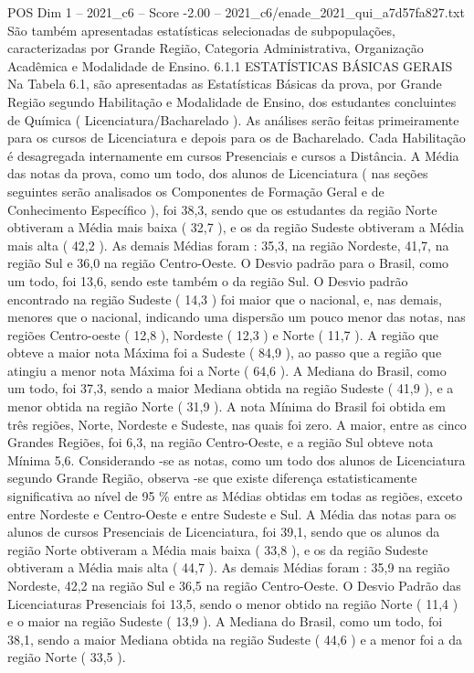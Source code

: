 \begin{textsample}{POS Dim 1 – 2021\_c6 – Score -2.00 – 2021\_c6/enade\_2021\_qui\_a7d57fa827.txt}
São também apresentadas estatísticas selecionadas de subpopulações, caracterizadas por Grande Região, Categoria Administrativa, Organização Acadêmica e Modalidade de Ensino. 6.1.1 ESTATÍSTICAS BÁSICAS GERAIS Na Tabela 6.1, são apresentadas as Estatísticas Básicas da prova, por Grande Região segundo Habilitação e Modalidade de Ensino, dos estudantes concluintes de Química ( Licenciatura/Bacharelado ).
As análises serão feitas primeiramente para os cursos de Licenciatura e depois para os de Bacharelado.
Cada Habilitação é desagregada internamente em cursos Presenciais e cursos a Distância.
A Média das notas da prova, como um todo, dos alunos de Licenciatura ( nas seções seguintes serão analisados os Componentes de Formação Geral e de Conhecimento Específico ), foi 38,3, sendo que os estudantes da região Norte obtiveram a Média mais baixa ( 32,7 ), e os da região Sudeste obtiveram a Média mais alta ( 42,2 ).
As demais Médias foram : 35,3, na região Nordeste, 41,7, na região Sul e 36,0 na região Centro-Oeste.
O Desvio padrão para o Brasil, como um todo, foi 13,6, sendo este também o da região Sul.
O Desvio padrão encontrado na região Sudeste ( 14,3 ) foi maior que o nacional, e, nas demais, menores que o nacional, indicando uma dispersão um pouco menor das notas, nas regiões Centro-oeste ( 12,8 ), Nordeste ( 12,3 ) e Norte ( 11,7 ).
A região que obteve a maior nota Máxima foi a Sudeste ( 84,9 ), ao passo que a região que atingiu a menor nota Máxima foi a Norte ( 64,6 ).
A Mediana do Brasil, como um todo, foi 37,3, sendo a maior Mediana obtida na região Sudeste ( 41,9 ), e a menor obtida na região Norte ( 31,9 ).
A nota Mínima do Brasil foi obtida em três regiões, Norte, Nordeste e Sudeste, nas quais foi zero.
A maior, entre as cinco Grandes Regiões, foi 6,3, na região Centro-Oeste, e a região Sul obteve nota Mínima 5,6.
Considerando -se as notas, como um todo dos alunos de Licenciatura segundo Grande Região, observa -se que existe diferença estatisticamente significativa ao nível de 95 \% entre as Médias obtidas em todas as regiões, exceto entre Nordeste e Centro-Oeste e entre Sudeste e Sul.
A Média das notas para os alunos de cursos Presenciais de Licenciatura, foi 39,1, sendo que os alunos da região Norte obtiveram a Média mais baixa ( 33,8 ), e os da região Sudeste obtiveram a Média mais alta ( 44,7 ).
As demais Médias foram : 35,9 na região Nordeste, 42,2 na região Sul e 36,5 na região Centro-Oeste.
O Desvio Padrão das Licenciaturas Presenciais foi 13,5, sendo o menor obtido na região Norte ( 11,4 ) e o maior na região Sudeste ( 13,9 ).
A Mediana do Brasil, como um todo, foi 38,1, sendo a maior Mediana obtida na região Sudeste ( 44,6 ) e a menor foi a da região Norte ( 33,5 ).

\end{textsample}
